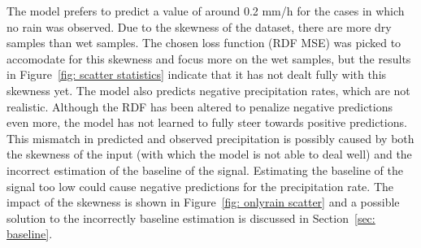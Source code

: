 \documentclass[twocolumn, 10pt, a4paper]{memoir}
\begin{document}
	The model prefers to predict a value of around 0.2 mm/h for the cases in which no rain was observed. Due to the skewness of the dataset, there are more dry samples than wet samples. The chosen loss function (RDF MSE) was picked to accomodate for this skewness and focus more on the wet samples, but the results in Figure~\ref{fig: scatter statistics} indicate that it has not dealt fully with this skewness yet. The model also predicts negative precipitation rates, which are not realistic. Although the RDF has been altered to penalize negative predictions even more, the model has not learned to fully steer towards positive predictions. This mismatch in predicted and observed precipitation is possibly caused by both the skewness of the input (with which the model is not able to deal well) and the incorrect estimation of the baseline of the signal. Estimating the baseline of the signal too low could cause negative predictions for the precipitation rate. The impact of the skewness is shown in Figure~\ref{fig: onlyrain scatter} and a possible solution to the incorrectly baseline estimation is discussed in Section~\ref{sec: baseline}.
	
\end{document}
